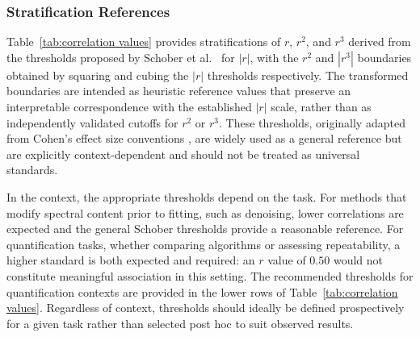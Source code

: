 \subsubsection{Stratification References}
\label{sec:Eval:subsec:RegMetrics:subsubsec:stratification}
Table~\ref{tab:correlation values} provides stratifications of $r$, $r^2$, and $r^3$ derived from the thresholds proposed by Schober et al.~\cite{Schober2018} for $|r|$, with the $r^2$ and $|r^3|$ boundaries obtained by squaring and cubing the $|r|$ thresholds respectively. The transformed boundaries are intended as heuristic reference values that preserve an interpretable correspondence with the established $|r|$ scale, rather than as independently validated cutoffs for $r^2$ or $r^3$. These thresholds, originally adapted from Cohen's effect size conventions \cite{Cohen1988}, are widely used as a general reference but are explicitly context-dependent and should not be treated as universal standards.

In the \MRS context, the appropriate thresholds depend on the task. For methods that modify spectral content prior to fitting, such as denoising, lower correlations are expected and the general Schober thresholds provide a reasonable reference. For quantification tasks, whether comparing algorithms or assessing repeatability, a higher standard is both expected and required: an $r$ value of $0.50$ would not constitute meaningful association in this setting. The recommended  thresholds for \MRS quantification contexts are provided in the lower rows of Table~\ref{tab:correlation values}. Regardless of context, thresholds should ideally be defined prospectively for a given task rather than selected post hoc to suit observed results.

